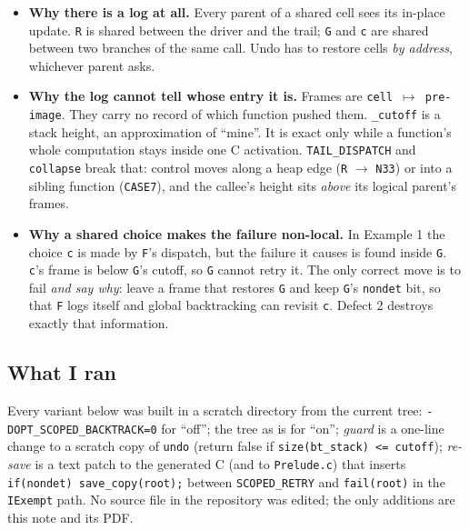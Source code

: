 \documentclass[11pt]{article}
\newcommand{\code}[1]{\texttt{#1}}
\begin{document}
\begin{itemize}[nosep]
\item \textbf{Why there is a log at all.} Every parent of a shared cell sees
  its in-place update. \code{R} is shared between the driver and the trail;
  \code{G} and \code{c} are shared between two branches of the same call.
  Undo has to restore cells \emph{by address}, whichever parent asks.
\item \textbf{Why the log cannot tell whose entry it is.} Frames are
  \code{cell $\mapsto$ pre-image}. They carry no record of which function
  pushed them. \code{\_cutoff} is a stack height, an approximation of
  ``mine''. It is exact only while a function's whole computation stays
  inside one C activation. \code{TAIL\_DISPATCH} and \code{collapse} break
  that: control moves along a heap edge (\code{R} $\to$ \code{N33}) or into a
  sibling function (\code{CASE7}), and the callee's height sits \emph{above}
  its logical parent's frames.
\item \textbf{Why a shared choice makes the failure non-local.} In Example 1
  the choice \code{c} is made by \code{F}'s dispatch, but the failure it
  causes is found inside \code{G}. \code{c}'s frame is below \code{G}'s
  cutoff, so \code{G} cannot retry it. The only correct move is to fail
  \emph{and say why}: leave a frame that restores \code{G} and keep
  \code{G}'s \code{nondet} bit, so that \code{F} logs itself and global
  backtracking can revisit \code{c}. Defect 2 destroys exactly that
  information.
\end{itemize}

\subsection{What I ran}

Every variant below was built in a scratch directory from the current tree:
\code{-DOPT\_SCOPED\_BACKTRACK=0} for ``off''; the tree as is for ``on'';
\emph{guard} is a one-line change to a scratch copy of \code{undo} (return
false if \code{size(bt\_stack) <= cutoff}); \emph{re-save} is a text patch to
the generated C (and to \code{Prelude.c}) that inserts
\code{if(nondet) save\_copy(root);} between \code{SCOPED\_RETRY} and
\code{fail(root)} in the \code{IExempt} path. No source file in the repository was edited; the only additions are this note and its PDF.
\end{document}
